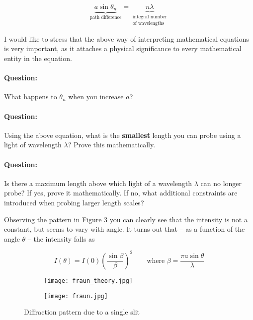 \begin{equation*}
\underbrace{a \sin{\theta_n}}_{\text{path difference}} = \underbrace{n \lambda}_{\substack{\text{integral number} \\ \text{of wavelengths}}}
\end{equation*}

I would like to stress that the above way of interpreting mathematical equations is very important, as it attaches a physical significance to every mathematical entity in the equation.


\begin{tcolorbox}
\paragraph{Question: } What happens to $\theta_n$ when you increase $a$? 

\paragraph{Question: } Using the above equation, what is the \textbf{smallest} length you can probe using a light of wavelength $\lambda$? Prove this mathematically.

\paragraph{Question: } Is there a maximum length above which light of a wavelength $\lambda$ can no longer probe? If yes, prove it mathematically. If no, what additional constraints are introduced when probing larger length scales?
\end{tcolorbox}

Observing the pattern in Figure \ref{img_diff} you can clearly see that the intensity is not a constant, but seems to vary with angle. It turns out that -- as a function of the angle $\theta$ -- the intensity falls as 

\begin{equation*}
I(\theta) = I(0) \left( \frac{\sin{\beta}}{\beta}\right)^2 \quad \quad \text{where  } \beta = \frac{\pi a \sin \theta}{\lambda}
\end{equation*}

\begin{figure}[!htb]
\centering
    \begin{subfigure}[b]{0.45\textwidth}
        \texttt{[image: fraun\_theory.jpg]}
        \label{fraun_theory}
    \end{subfigure}
\begin{subfigure}[b]{0.45\textwidth}
       \texttt{[image: fraun.jpg]}
        \label{fraun}
    \end{subfigure}
\caption{Diffraction pattern due to a single slit}
\label{img_diff}
\end{figure}


